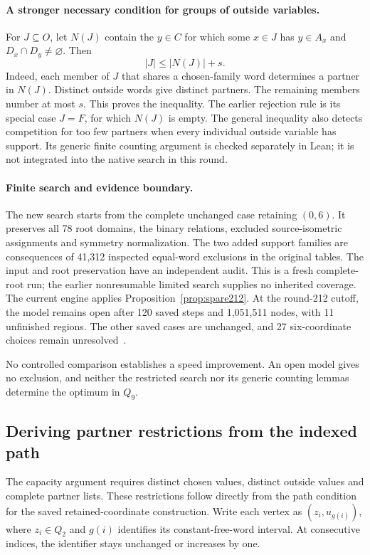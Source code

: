 \documentclass[11pt,a4paper]{article}
\theoremstyle{definition}
\theoremstyle{remark}
\begin{document}
\paragraph{A stronger necessary condition for groups of outside variables.}
For $J\subseteq O$, let $N(J)$ contain the $y\in C$ for which some
$x\in J$ has $y\in A_x$ and $D_x\cap D_y\ne\varnothing$. Then
\begin{equation}\label{eq:partner-capacity212}
|J|\le |N(J)|+s.
\end{equation}
Indeed, each member of $J$ that shares a chosen-family word determines
a partner in $N(J)$. Distinct outside words give distinct partners.
The remaining members number at most $s$. This proves the inequality.
The earlier rejection rule is its special case $J=F$, for which
$N(J)$ is empty. The general inequality also detects competition for
too few partners when every individual outside variable has support.
Its generic finite counting argument is checked separately in Lean;
it is not integrated into the native search in this round.

\paragraph{Finite search and evidence boundary.}
The new search starts from the complete unchanged case retaining
$(0,6)$. It preserves all 78 root domains, the binary relations,
excluded source-isometric assignments and symmetry normalization.
The two added support families are consequences of 41,312 inspected
equal-word exclusions in the original tables. The input and root
preservation have an independent audit. This is a fresh complete-root
run; the earlier nonresumable limited search supplies no inherited
coverage. The current engine applies Proposition~\ref{prop:spare212}.
At the round-212 cutoff, the model remains open after 120 saved
steps and 1,051,511 nodes, with 11 unfinished regions.
The other saved cases are unchanged, and 27 six-coordinate choices
remain unresolved~\cite{research212}.

No controlled comparison establishes a speed improvement. An open
model gives no exclusion, and neither the restricted search nor its
generic counting lemmas determine the optimum in $Q_9$.


\subsection{Deriving partner restrictions from the indexed path}
\label{sec:interval213}
The capacity argument requires distinct chosen values, distinct outside
values and complete partner lists. These restrictions follow directly
from the path condition for the saved retained-coordinate construction.
Write each vertex as $(z_i,u_{g(i)})$, where $z_i\in Q_2$ and $g(i)$
identifies its constant-free-word interval. At consecutive indices,
the identifier stays unchanged or increases by one.
\end{document}
